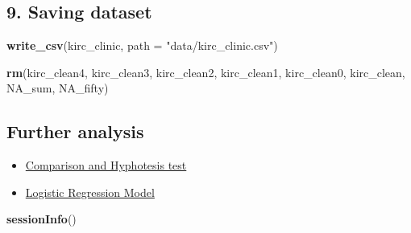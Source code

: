 \documentclass[]{article}
\newenvironment{Shaded}{\begin{snugshade}}{\end{snugshade}}
\newcommand{\KeywordTok}[1]{\textcolor[rgb]{0.13,0.29,0.53}{\textbf{#1}}}
\newcommand{\DataTypeTok}[1]{\textcolor[rgb]{0.13,0.29,0.53}{#1}}
\newcommand{\StringTok}[1]{\textcolor[rgb]{0.31,0.60,0.02}{#1}}
\newcommand{\NormalTok}[1]{#1}
\providecommand{\tightlist}{%
  \setlength{\itemsep}{0pt}\setlength{\parskip}{0pt}}
\begin{document}
\subsection{9. Saving dataset}\label{saving-dataset}

\begin{Shaded}
\begin{Highlighting}[]
\KeywordTok{write_csv}\NormalTok{(kirc_clinic, }\DataTypeTok{path =} \StringTok{"data/kirc_clinic.csv"}\NormalTok{)}

\KeywordTok{rm}\NormalTok{(kirc_clean4, kirc_clean3, kirc_clean2, kirc_clean1, kirc_clean0, kirc_clean, NA_sum, NA_fifty)}
\end{Highlighting}
\end{Shaded}

\subsection{Further analysis}\label{further-analysis}

\begin{itemize}
\tightlist
\item
  \href{2.correlation.md}{Comparison and Hyphotesis test}
\item
  \href{3.logistic_regression.md}{Logistic Regression Model}
\end{itemize}

\begin{Shaded}
\begin{Highlighting}[]
\KeywordTok{sessionInfo}\NormalTok{()}
\end{Highlighting}
\end{Shaded}
\end{document}
